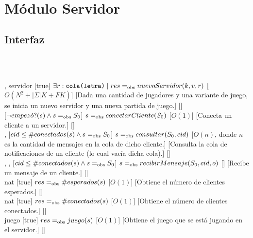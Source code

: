 \section{Módulo Servidor}
\begin{interfaz}{\subsection{Interfaz}}
  \\\\
  \par\noindent
  \begin{operaciones}
    {, }{servidor}
    [true]
    {$\exists r: \texttt{cola(letra)} \mid res =_{\mathrm{obs}} nuevoServidor(k,v,r)$}
    [$O(N^{2}+|\Sigma|K+FK)$]
    [Dada una cantidad de jugadores y una variante de juego, se inicia un nuevo servidor y una nueva partida de juego.]
    [\falta]\\

    \noindent{}
    {}{}
    [$\lnot empez\acute{o}?(s) \land s=_{\mathrm{obs}} S_{0}$]
    {$s=_{\mathrm{obs}} conectarCliente(S_{0})$}
    [$O(1)$]
    [Conecta un cliente a un servidor.]
    [\falta]\\

    \noindent{}
    {, }{}
    [$cid\leq \#conectados(s) \land s=_{\mathrm{obs}} S_{0}$]
    {$s=_{\mathrm{obs}} consultar(S_{0},cid)$}
    [$O(n)$, donde $n$ es la cantidad de mensajes en la cola de dicho cliente.]
    [Consulta la cola de notificaciones de un cliente (lo cual vacía dicha cola).]
    [\falta]\\

    \noindent{}
    {, , }{}
    [$cid\leq \#conectados(s) \land s=_{\mathrm{obs}} S_{0}$]
    {$s=_{\mathrm{obs}} recibirMensaje(S_{0},cid,o)$}
    [\falta]
    [Recibe un mensaje de un cliente.]
    [\falta]\\

    \noindent{}
    {}{nat}
    [true]
    {$res=_{\mathrm{obs}} \#esperados(s)$}
    [$O(1)$]
    [Obtiene el número de clientes esperados.]
    [\falta]\\

    \noindent{}
    {}{nat}
    [true]
    {$res=_{\mathrm{obs}} \#conectados(s)$}
    [$O(1)$]
    [Obtiene el número de clientes conectados.]
    [\falta]\\

    \noindent{}
    {}{juego}
    [true]
    {$res=_{\mathrm{obs}} juego(s)$}
    [$O(1)$]
    [Obtiene el juego que se está jugando en el servidor.]
    [\falta]\\
  \end{operaciones}
\end{interfaz}

